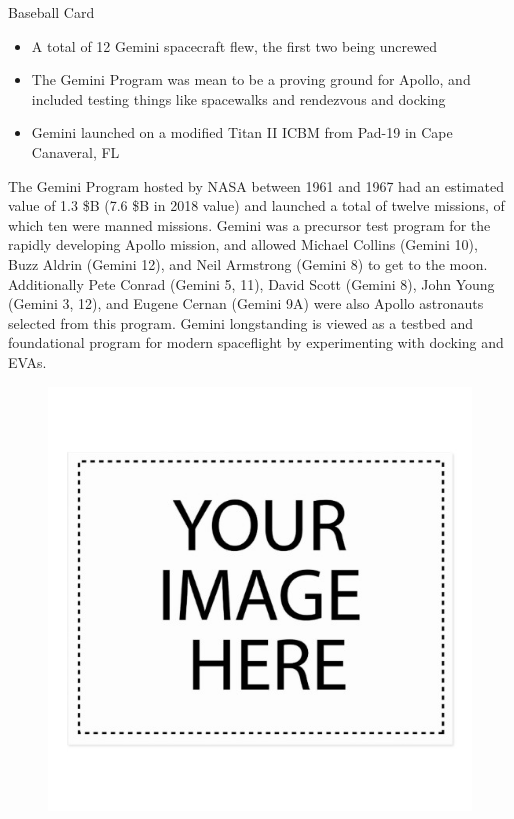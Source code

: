 \documentclass[10pt]{beamer}
\begin{document}
	\begin{frame}{Baseball Card}
	\begin{minipage}{0.49\textwidth}
\begin{itemize}
	\item A total of 12 Gemini spacecraft flew, the first two being uncrewed
	\item The Gemini Program was mean to be a proving ground for Apollo, and included testing things like spacewalks and rendezvous and docking
	\item Gemini launched on a modified Titan II ICBM from Pad-19 in Cape Canaveral, FL
\end{itemize}

The Gemini Program hosted by NASA between 1961 and 1967 had an estimated value of 1.3 \$B (7.6 \$B in 2018 value) and launched a total of twelve missions, of which ten were manned missions. Gemini was a precursor test program for the rapidly developing Apollo mission, and allowed Michael Collins (Gemini 10), Buzz Aldrin (Gemini 12), and Neil Armstrong (Gemini 8) to get to the moon. Additionally Pete Conrad (Gemini 5, 11), David Scott (Gemini 8), John Young (Gemini 3, 12), and Eugene Cernan (Gemini 9A) were also Apollo astronauts selected from this program. Gemini longstanding is viewed as a testbed and foundational program for modern spaceflight by experimenting with docking and EVAs. 




	\end{minipage}%
\begin{minipage}{0.49\textwidth}
	\begin{figure}
		\centering
		\includegraphics[width=\textwidth]{Group_Beauty.png}
	\end{figure}
	
\end{minipage}

\end{frame}
\end{document}
